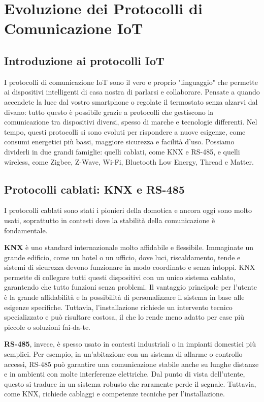 \chapter{Evoluzione dei Protocolli di Comunicazione IoT}

\section{Introduzione ai protocolli IoT}
I protocolli di comunicazione IoT sono il vero e proprio "linguaggio" che permette ai dispositivi intelligenti di casa nostra di parlarsi e collaborare. Pensate a quando accendete la luce dal vostro smartphone o regolate il termostato senza alzarvi dal divano: tutto questo è possibile grazie a protocolli che gestiscono la comunicazione tra dispositivi diversi, spesso di marche e tecnologie differenti. Nel tempo, questi protocolli si sono evoluti per rispondere a nuove esigenze, come consumi energetici più bassi, maggiore sicurezza e facilità d’uso. Possiamo dividerli in due grandi famiglie: quelli cablati, come KNX e RS-485, e quelli wireless, come Zigbee, Z-Wave, Wi-Fi, Bluetooth Low Energy, Thread e Matter.

\section{Protocolli cablati: KNX e RS-485}
I protocolli cablati sono stati i pionieri della domotica e ancora oggi sono molto usati, soprattutto in contesti dove la stabilità della comunicazione è fondamentale.

\textbf{KNX} è uno standard internazionale molto affidabile e flessibile. Immaginate un grande edificio, come un hotel o un ufficio, dove luci, riscaldamento, tende e sistemi di sicurezza devono funzionare in modo coordinato e senza intoppi. KNX permette di collegare tutti questi dispositivi con un unico sistema cablato, garantendo che tutto funzioni senza problemi. Il vantaggio principale per l’utente è la grande affidabilità e la possibilità di personalizzare il sistema in base alle esigenze specifiche. Tuttavia, l’installazione richiede un intervento tecnico specializzato e può risultare costosa, il che lo rende meno adatto per case più piccole o soluzioni fai-da-te.

\textbf{RS-485}, invece, è spesso usato in contesti industriali o in impianti domestici più semplici. Per esempio, in un’abitazione con un sistema di allarme o controllo accessi, RS-485 può garantire una comunicazione stabile anche su lunghe distanze e in ambienti con molte interferenze elettriche. Dal punto di vista dell’utente, questo si traduce in un sistema robusto che raramente perde il segnale. Tuttavia, come KNX, richiede cablaggi e competenze tecniche per l’installazione.

